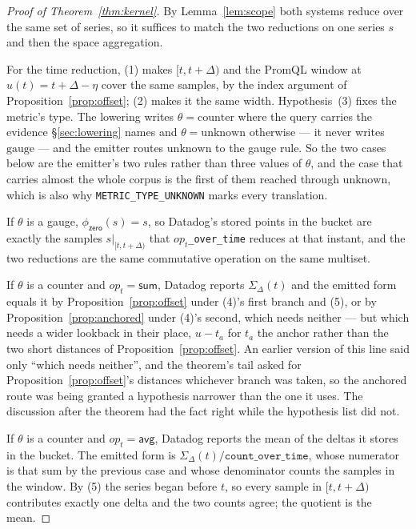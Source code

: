 \begin{proof}[Proof of Theorem~\ref{thm:kernel}]
By Lemma~\ref{lem:scope} both systems reduce over the same set of series, so it suffices
to match the two reductions on one series $s$ and then the space aggregation.

For the time reduction, (1) makes $[t,t+\Delta)$ and the PromQL window at
$u(t)=t+\Delta-\eta$ cover the same samples, by the index argument of
Proposition~\ref{prop:offset}; (2) makes it the same width. Hypothesis~(3) fixes the metric's
type. The lowering writes $\theta=\text{counter}$ where the query carries the evidence
\S\ref{sec:lowering} names and $\theta=\text{unknown}$ otherwise --- it never writes
$\text{gauge}$ --- and the emitter routes $\text{unknown}$ to the gauge rule. So the two
cases below are the emitter's two rules rather than three values of $\theta$, and the
case that carries almost the whole corpus is the first of them reached through
$\text{unknown}$, which is also why \texttt{METRIC\_TYPE\_UNKNOWN} marks every
translation.

If $\theta$ is a gauge, $\phi_{\mathsf{zero}}(s)=s$, so Datadog's stored points in the
bucket are exactly the samples $s|_{[t,t+\Delta)}$ that
\texttt{$\mathit{op}_t$\_over\_time} reduces at that instant, and the two reductions are
the same commutative operation on the same multiset.

If $\theta$ is a counter and $\mathit{op}_t=\mathsf{sum}$, Datadog reports
$\Sigma_\Delta(t)$ and the emitted form equals it by Proposition~\ref{prop:offset}
under (4)'s first branch and (5), or by Proposition~\ref{prop:anchored} under (4)'s
second, which needs neither --- but which needs a wider lookback in their place, $u-t_a$
for $t_a$ the anchor rather than the two short distances of
Proposition~\ref{prop:offset}. An earlier version of this line said only ``which needs
neither'', and the theorem's tail asked for Proposition~\ref{prop:offset}'s distances
whichever branch was taken, so the anchored route was being granted a hypothesis
narrower than the one it uses. The discussion after the theorem had the fact right while
the hypothesis list did not.

If $\theta$ is a counter and $\mathit{op}_t=\mathsf{avg}$, Datadog reports the mean of
the deltas it stores in the bucket. The emitted form is
$\Sigma_\Delta(t)/\texttt{count\_over\_time}$, whose numerator is that sum by the
previous case and whose denominator counts the samples in the window. By (5) the series
began before $t$, so every sample in $[t,t+\Delta)$ contributes exactly one delta and
the two counts agree; the quotient is the mean.


\end{proof}
